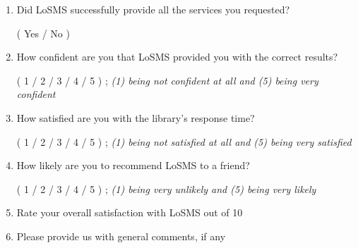 \documentclass[12pt, titlepage]{article}
\newcommand{\famname}{LoSMS} %
\begin{document}
\begin{enumerate}
	\item Did \famname{} successfully provide all the services you requested?
	
	(	Yes	/	No	)
	\item How confident are you that \famname{} provided you with the correct 
	results?
	
	(	1	/	2	/	3	/	4	/	5	) ; \textit{(1) being not confident 
	at all and (5) being very confident}

	\item How satisfied are you with the library's response time?  
	
	(	1	/	2	/	3	/	4	/	5	) ; \textit{(1) being not satisfied 
	at all and (5) being very satisfied}

	\item How likely are you to recommend \famname{} to a friend?
	
	(	1	/	2	/	3	/	4	/	5	) ; \textit{(1) being very unlikely 
	and (5) being very likely}

	\item Rate your overall satisfaction with \famname{} out of 10
	
	\item Please provide us with general comments, if any
\end {enumerate}
\end{document}
